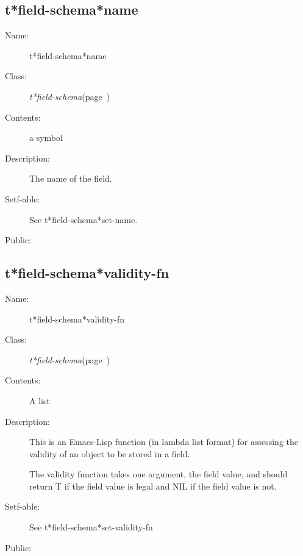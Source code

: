 \subsection{t*field-schema*name}
\label{t*field-schema*name}

\begin{description}
\item [Name:]  t*field-schema*name

\item [Class:] {\sl t*field-schema}\hfill(page~\pageref{t*field-schema})

\item [Contents:] a symbol

\item [Description:]

The name of the field. 

\item [Setf-able:] See t*field-schema*set-name.


\item [Public:]



\end{description}
\horizontalline

\subsection{t*field-schema*validity-fn}
\label{t*field-schema*validity-fn}

\begin{description}
\item [Name:]  t*field-schema*validity-fn

\item [Class:] {\sl t*field-schema}\hfill(page~\pageref{t*field-schema})

\item [Contents:] A list

\item [Description:]

This is an Emacs-Lisp function (in lambda list format) for 
assessing the validity of an object to be stored in a 
field. 

The validity function takes one argument, the field 
value, and should return T if the field value is legal
and NIL if the field value is not. 

\item [Setf-able:] See t*field-schema*set-validity-fn

\item [Public:]



\end{description}
\horizontalline

